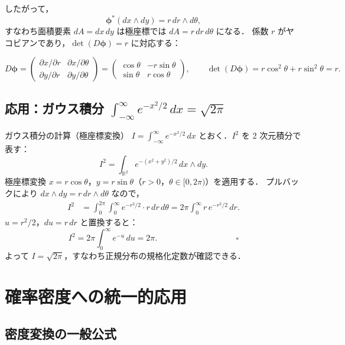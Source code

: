 \documentclass[lualatex,ja=standard,a4paper,12pt]{bxjsarticle}
\begin{document}
したがって，
\[
  \boldsymbol{\phi}^*(dx\wedge dy) = r\,dr\wedge d\theta,
\]
すなわち面積要素 $dA = dx\,dy$ は極座標では $dA = r\,dr\,d\theta$ になる．
係数 $r$ がヤコビアンであり，$\det(D\boldsymbol{\phi}) = r$ に対応する：

\[
  D\boldsymbol{\phi} =
  \begin{pmatrix}
    \partial x/\partial r & \partial x/\partial\theta \\
    \partial y/\partial r & \partial y/\partial\theta
  \end{pmatrix}
  =
  \begin{pmatrix} \cos\theta & -r\sin\theta \\ \sin\theta & r\cos\theta \end{pmatrix},
  \qquad
  \det(D\boldsymbol{\phi}) = r\cos^2\theta + r\sin^2\theta = r.
\]

\subsection{応用：ガウス積分 $\int_{-\infty}^{\infty} e^{-x^2/2}\,dx = \sqrt{2\pi}$}

\begin{derivbox}{ガウス積分の計算（極座標変換）}
$I = \int_{-\infty}^{\infty} e^{-x^2/2}\,dx$ とおく．$I^2$ を 2 次元積分で表す：
\[
  I^2 = \int_{\mathbb{R}^2} e^{-(x^2+y^2)/2}\,dx\wedge dy.
\]
極座標変換 $x = r\cos\theta$，$y = r\sin\theta$（$r>0$，$\theta\in[0,2\pi)$）を適用する．
プルバックにより $dx\wedge dy = r\,dr\wedge d\theta$ なので，
\begin{align*}
  I^2
  &= \int_0^{2\pi}\int_0^{\infty} e^{-r^2/2}\cdot r\,dr\,d\theta
   = 2\pi \int_0^{\infty} r\,e^{-r^2/2}\,dr.
\end{align*}
$u = r^2/2$，$du = r\,dr$ と置換すると：
\[
  I^2 = 2\pi\int_0^{\infty} e^{-u}\,du = 2\pi. \hspace{4cm}\square
\]
よって $I = \sqrt{2\pi}$，すなわち正規分布の規格化定数が確認できる．
\end{derivbox}

\section{確率密度への統一的応用}

\subsection{密度変換の一般公式}
\end{document}
